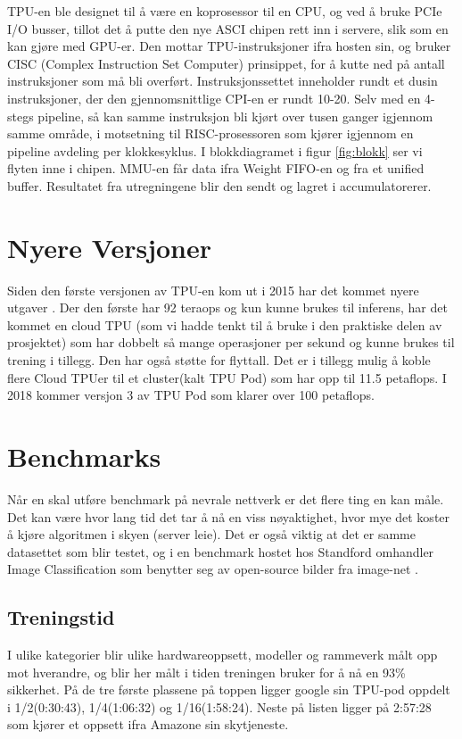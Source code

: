 TPU-en ble designet til å være en koprosessor til en CPU, og ved å bruke PCIe I/O busser, tillot det å putte den nye ASCI chipen rett inn i servere, slik som en kan gjøre med GPU-er. Den mottar TPU-instruksjoner ifra hosten sin, og bruker CISC (Complex Instruction Set Computer) prinsippet, for å kutte ned på antall instruksjoner som må bli overført. Instruksjonssettet inneholder rundt et dusin instruksjoner, der den gjennomsnittlige CPI-en er rundt 10-20. Selv med en 4-stegs pipeline, så kan samme instruksjon bli kjørt over tusen ganger igjennom samme område, i motsetning til RISC-prosessoren som kjører igjennom en pipeline avdeling per klokkesyklus. 
I blokkdiagramet i figur \ref{fig:blokk} ser vi flyten inne i chipen. MMU-en får data ifra Weight FIFO-en og fra et unified buffer. Resultatet fra utregningene blir den sendt og lagret i accumulatorerer.

\newpage
\section{Nyere Versjoner}
Siden den første versjonen av TPU-en kom ut i 2015 har det kommet nyere utgaver \cite{tpu_video}. Der den første har 92 teraops og kun kunne brukes til inferens, har det kommet en cloud TPU (som vi hadde tenkt til å bruke i den praktiske delen av prosjektet) som har dobbelt så mange operasjoner per sekund og kunne brukes til trening i tillegg. Den har også støtte for flyttall. Det er i tillegg mulig å koble flere Cloud TPUer til et cluster(kalt TPU Pod) som har opp til 11.5 petaflops. I 2018 kommer versjon 3 av TPU Pod som klarer over 100 petaflops.

\section{Benchmarks}

Når en skal utføre benchmark på nevrale nettverk er det flere ting en kan måle. Det kan være hvor lang tid det tar å nå en viss nøyaktighet, hvor mye det koster å kjøre algoritmen i skyen (server leie). Det er også viktig at det er samme datasettet som blir testet, og i en benchmark\cite{benchmark} hostet hos Standford omhandler Image Classification som benytter seg av open-source bilder fra image-net \cite{image-net}.

\subsection{Treningstid}
I ulike kategorier blir ulike hardwareoppsett, modeller og rammeverk målt opp mot hverandre, og blir her målt i tiden treningen bruker for å nå en 93\% sikkerhet. På de tre første plassene på toppen ligger google sin TPU-pod oppdelt i 1/2(0:30:43), 1/4(1:06:32) og 1/16(1:58:24). Neste på listen ligger på 2:57:28 som kjører et oppsett ifra Amazone sin skytjeneste. 

